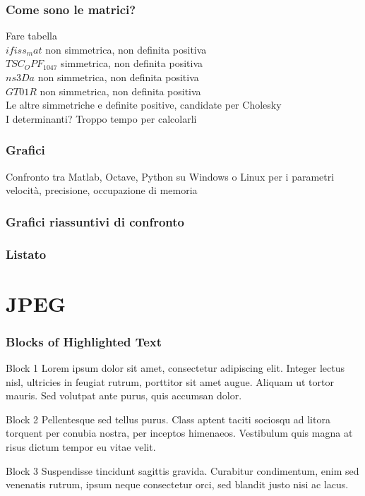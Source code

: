 \documentclass{beamer}
\begin{document}

\frametitle{Come sono le matrici?}
\begin{frame}
Fare tabella\\
$ifiss_mat$ non simmetrica, non definita positiva\\
$TSC_OPF_1047$ simmetrica, non definita positiva\\
$ns3Da$ non simmetrica, non definita positiva\\
$GT01R$ non simmetrica, non definita positiva\\
Le altre simmetriche e definite positive, candidate per Cholesky\\
I determinanti? Troppo tempo per calcolarli
\end{frame}

\frametitle{Grafici}
\begin{frame}
Confronto tra Matlab,  Octave, Python su Windows o Linux per i parametri velocità, precisione, occupazione di memoria
\end{frame}

\frametitle{Grafici riassuntivi di confronto}
\begin{frame}

\end{frame}

\frametitle{Listato}
\begin{frame}

\end{frame}

\section{JPEG}



\begin{frame}
\frametitle{Blocks of Highlighted Text}
\begin{block}{Block 1}
Lorem ipsum dolor sit amet, consectetur adipiscing elit. Integer lectus nisl, ultricies in feugiat rutrum, porttitor sit amet augue. Aliquam ut tortor mauris. Sed volutpat ante purus, quis accumsan dolor.
\end{block}

\begin{block}{Block 2}
Pellentesque sed tellus purus. Class aptent taciti sociosqu ad litora torquent per conubia nostra, per inceptos himenaeos. Vestibulum quis magna at risus dictum tempor eu vitae velit.
\end{block}

\begin{block}{Block 3}
Suspendisse tincidunt sagittis gravida. Curabitur condimentum, enim sed venenatis rutrum, ipsum neque consectetur orci, sed blandit justo nisi ac lacus.
\end{block}
\end{frame}
\end{document}
